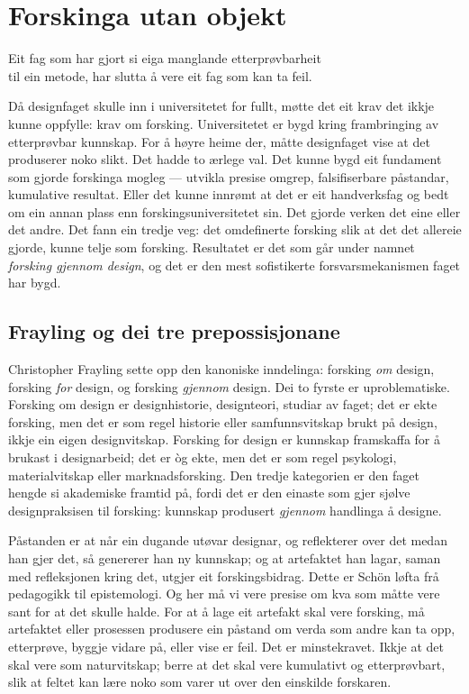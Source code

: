 \chapter{Forskinga utan objekt}

\begin{motto}
Eit fag som har gjort si eiga manglande etterprøvbarheit\\ til ein metode, har slutta å vere eit fag som kan ta feil.
\end{motto}

Då designfaget skulle inn i universitetet for fullt, møtte det eit krav det ikkje kunne oppfylle: krav om forsking. Universitetet er bygd kring frambringing av etterprøvbar kunnskap. For å høyre heime der, måtte designfaget vise at det produserer noko slikt. Det hadde to ærlege val. Det kunne bygd eit fundament som gjorde forskinga mogleg — utvikla presise omgrep, falsifiserbare påstandar, kumulative resultat. Eller det kunne innrømt at det er eit handverksfag og bedt om ein annan plass enn forskingsuniversitetet sin. Det gjorde verken det eine eller det andre. Det fann ein tredje veg: det omdefinerte forsking slik at det det allereie gjorde, kunne telje som forsking. Resultatet er det som går under namnet \emph{forsking gjennom design}, og det er den mest sofistikerte forsvarsmekanismen faget har bygd.

\section{Frayling og dei tre prepossisjonane}

Christopher Frayling sette opp den kanoniske inndelinga: forsking \emph{om} design, forsking \emph{for} design, og forsking \emph{gjennom} design. Dei to fyrste er uproblematiske. Forsking om design er designhistorie, designteori, studiar av faget; det er ekte forsking, men det er som regel historie eller samfunnsvitskap brukt på design, ikkje ein eigen designvitskap. Forsking for design er kunnskap framskaffa for å brukast i designarbeid; det er òg ekte, men det er som regel psykologi, materialvitskap eller marknadsforsking. Den tredje kategorien er den faget hengde si akademiske framtid på, fordi det er den einaste som gjer sjølve designpraksisen til forsking: kunnskap produsert \emph{gjennom} handlinga å designe.

Påstanden er at når ein dugande utøvar designar, og reflekterer over det medan han gjer det, så genererer han ny kunnskap; og at artefaktet han lagar, saman med refleksjonen kring det, utgjer eit forskingsbidrag. Dette er Schön løfta frå pedagogikk til epistemologi. Og her må vi vere presise om kva som måtte vere sant for at det skulle halde. For at å lage eit artefakt skal vere forsking, må artefaktet eller prosessen produsere ein påstand om verda som andre kan ta opp, etterprøve, byggje vidare på, eller vise er feil. Det er minstekravet. Ikkje at det skal vere som naturvitskap; berre at det skal vere kumulativt og etterprøvbart, slik at feltet kan lære noko som varer ut over den einskilde forskaren.

